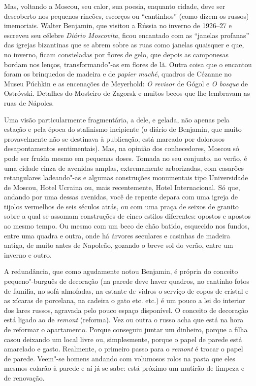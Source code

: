 Mas, voltando a Moscou, seu calor, sua poesia, enquanto cidade, deve ser
descoberto nos pequenos rincões, escorços ou ``cantinhos'' (como dizem
os russos) imemoriais. Walter Benjamin, que visitou a Rússia no inverno
de 1926--27 e escreveu seu célebre \emph{Diário Moscovita}, ficou
encantado com as ``janelas profanas'' das igrejas bizantinas que se
abrem sobre as ruas como janelas quaisquer e que, no inverno, ficam
consteladas por flores de gelo, que depois as camponesas bordam nos
lenços, transformando"-as em flores de lã. Outra coisa que o encantou
foram os brinquedos de madeira e de \emph{papier maché}, quadros de
Cézanne no Museu Púchkin e as encenações de Meyerhold: \emph{O revisor}
de Gógol e \emph{O bosque} de Ostróvski. Detalhes do Mosteiro de Zagorsk
e muitos becos que lhe lembravam as ruas de Nápoles.

Uma visão particularmente fragmentária, a dele, e gelada, não apenas
pela estação e pela época do stalinismo incipiente (o diário de
Benjamin, que muito provavelmente não se destinava à publicação, está
marcado por dolorosos desapontamentos sentimentais). Mas, na opinião dos
conhecedores, Moscou só pode ser fruída mesmo em pequenas doses. Tomada
no seu conjunto, no verão, é uma cidade cinza de avenidas amplas,
extremamente arborizadas, com casarões retangulares ladeando"-as e
algumas construções monumentais tipo Universidade de Moscou, Hotel
Ucraina ou, mais recentemente, Hotel Internacional. Só que, andando por
uma dessas avenidas, você de repente depara com uma igreja de tijolos
vermelhos de seis séculos atrás, ou com uma praça de seixos de granito
sobre a qual se assomam construções de cinco estilos diferentes: opostos
e apostos ao mesmo tempo. Ou mesmo com um beco de chão batido, esquecido
nos fundos, entre uma quadra e outra, onde há árvores seculares e
casinhas de madeira antiga, de muito antes de Napoleão, gozando o breve
sol do verão, entre um inverno e outro.

A redundância, que como agudamente notou Benjamin, é própria do conceito
pequeno"-burguês de decoração (na parede deve haver quadros, no cantinho
fotos de família, no sofá almofadas, na estante de vidros o serviço de
copos de cristal e as xícaras de porcelana, na cadeira o gato etc. etc.)
é um pouco a lei do interior dos lares russos, agravada pelo pouco
espaço disponível. O conceito de decoração está ligado ao de
\emph{remont} (reforma). Vez ou outra o russo acha que está na hora de
reformar o apartamento. Porque conseguiu juntar um dinheiro, porque a
filha casou deixando um local livre ou, simplesmente, porque o papel de
parede está amarelado e gasto. Realmente, o primeiro passo para o
\emph{remont} é trocar o papel de parede. Veem"-se homens andando com
volumosos rolos na pasta que eles mesmos colarão à parede e aí já se
sabe: está próximo um mutirão de limpeza e de renovação.

